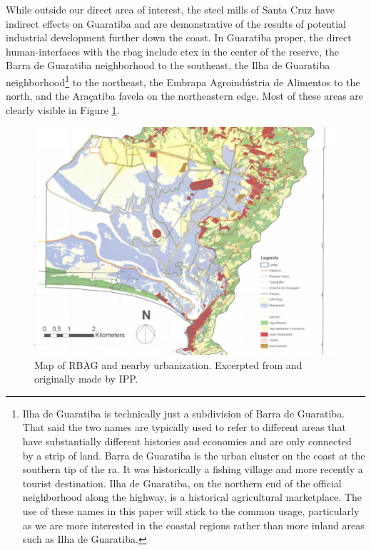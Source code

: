 While outside our direct area of interest, the steel mills of Santa Cruz have indirect effects on Guaratiba and are demonstrative of the results of potential industrial development further down the coast. In Guaratiba proper, the direct human-interfaces with the \ac{rbag} include \ac{ctex} in the center of the reserve, the Barra de Guaratiba neighborhood to the southeast, the Ilha de Guaratiba neighborhood\footnote{Ilha de Guaratiba is technically just a subdivision of Barra de Guaratiba. That said the two names are typically used to refer to different areas that have substantially different histories and economies and are only connected by a strip of land. Barra de Guaratiba is the urban cluster on the coast at the southern tip of the \ac{ra}. It was historically a fishing village and more recently a tourist destination. Ilha de Guaratiba, on the northern end of the official neighborhood along the highway, is a historical agricultural marketplace. The use of these names in this paper will stick to the common usage, particularly as we are more interested in the coastal regions rather than more inland areas such as Ilha de Guaratiba.} to the northeast, the Embrapa Agroindústria de Alimentos to the north, and the Araçatiba favela on the northeastern edge. Most of these areas are clearly visible in Figure \ref{fig:rbag}.

\begin{figure}[!htb]
	\centering
	\includegraphics[scale=0.3]{Figures/chap4/RBAG.png}
	\caption[Map of RBAG and nearby urbanization]{Map of RBAG and nearby urbanization. Excerpted from \cite{herzogGuaratibaVerdeSubsidios2009} and originally made by IPP.}
	\label{fig:rbag}
\end{figure}

